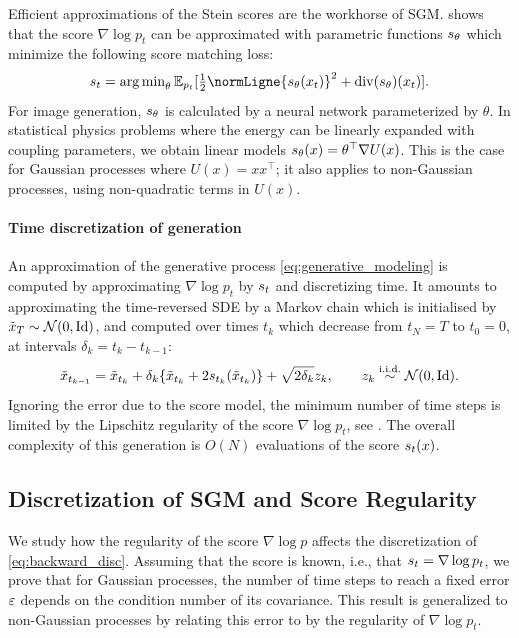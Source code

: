 \documentclass{article}
\begin{document}
Efficient approximations of the Stein scores
are the workhorse of SGM. \cite{hyvarinen2005estimation} shows that
the score $\nabla \log p_t$ can be approximated with parametric functions
${{s}}_\theta$ which minimize the following score matching loss:
    \begin{equation}
      \label{eq:ism_loss}
       \textstyle{
      { s}_t =  \argmin_{\theta} {\mathbb E}_{p_t} [
      \frac 1 2 \normLigne{ {\bs}_\theta(x_t)}^2 +
        \mathrm{div}({\bs}_\theta)(x_t)}]  .
    \end{equation}
For image generation, ${s}_{\theta}$ is calculated by a neural
network parameterized by $\theta$. In statistical physics problems where the
energy can be linearly expanded with coupling parameters, we obtain linear
models ${s}_\theta(x) = \theta^\top \nabla U(x)$.
This is the case for Gaussian processes where $U(x) = x x^\top$; it also
applies to non-Gaussian processes, using non-quadratic terms in $U(x)$. 
    
\paragraph{Time discretization of generation} 
An approximation of the generative process \eqref{eq:generative_modeling} is
computed by approximating $\nabla \log p_t$ by ${s}_t$ and
discretizing time. It amounts to approximating the time-reversed SDE by a Markov
chain which is initialised by $\tilde{x}_T \sim {\cal N}(0, \operatorname{Id})$, and computed over
times $t_k$ which decrease from $t_N = T$ to $t_0 = 0$, at intervals
$\delta_k = t_{k} - t_{k-1}$:
\begin{equation}
  \label{eq:backward_disc}
  \tilde{x}_{t_{k-1}} = \tilde{x}_{t_{k}} + \delta_{k} \{ \tilde{x}_{t_{k}} + 2  {{s}}_{ t_{k}}(\tilde{x}_{t_{k}})\} + \sqrt{2 \delta_{k}} z_{k} , \qquad z_k  \overset{\textup{i.i.d.}}{\sim} {\cal N}(0,\operatorname{Id}) . 
\end{equation}
Ignoring the error due to the score model, the minimum number of time steps is
limited by the Lipschitz regularity of the score $\nabla \log p_t$, see
\cite[Theorem 1]{debortoli2021diffusion}. The overall complexity of this
generation is $O(N)$ evaluations of the score ${{s}}_{ t}(x)$.

\subsection{Discretization of SGM and Score Regularity}
\label{sec:sampl-accel-accur}
We study how the regularity of the score $\nabla \log p$ affects the
discretization of \eqref{eq:backward_disc}. Assuming that the score is known,
i.e., that ${s}_t = \nabla \log p_t$, we prove that for Gaussian
processes, the number of time steps to reach a fixed error $\varepsilon$ depends on
the condition number of its covariance.  This result is generalized to
non-Gaussian processes by relating this error to by the regularity
of $\nabla \log p_t$.
\end{document}
